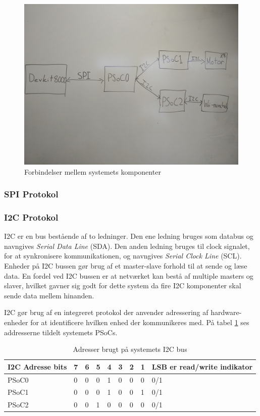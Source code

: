 \begin{figure}[H]
	\centering
	\includegraphics[width=\textwidth] {Systemarkitektur/images/overordnetstruktur}
	\caption{Forbindelser mellem systemets komponenter}
	\label{fig:kommunikationsOverblik}
\end{figure}

\subsubsection{SPI Protokol}

\subsubsection{I2C Protokol}

I2C\cite{I2C} er en bus bestående af to ledninger. Den ene ledning bruges som databus og navngives \textit{Serial Data Line} (SDA). Den anden ledning bruges til clock signalet, for at synkronisere kommunikationen, og navngives \textit{Serial Clock Line} (SCL). Enheder på I2C bussen gør brug af et master-slave forhold til at sende og læse data. En fordel ved I2C bussen er at netværket kan bestå af multiple masters og slaver, hvilket gavner sig godt for dette system da fire I2C komponenter skal sende data mellem hinanden.

I2C gør brug af en integreret protokol der anvender adressering af hardware-enheder for at identificere hvilken enhed der kommunikeres med. På tabel \ref{table:I2CAdress} ses addresserne tildelt systemets PSoCs.

\begin{table}[H]
	\centering
	\begin{tabular}{l|lllllll|l}
		\hline
		I2C Adresse bits & 7 & 6 & 5 & 4 & 3 & 2 & 1 & LSB er read/write indikator \\ \hline
		PSoC0        & 0 & 0 & 0 & 1 & 0 & 0 & 0 & 0/1                        \\
		PSoC1        & 0 & 0 & 0 & 1 & 0 & 0 & 1 & 0/1                        \\
		PSoC2        & 0 & 0 & 1 & 0 & 0 & 0 & 0 & 0/1                        \\ \hline
	\end{tabular}
	\caption{Adresser brugt på systemets I2C bus}
	\label{table:I2CAdress}
\end{table}

